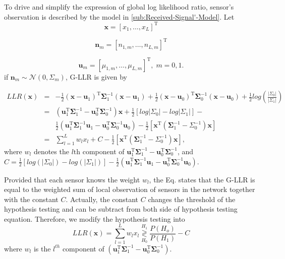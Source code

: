 To drive and simplify the expression of global log likelihood ratio,
sensor\textquoteright{}s observation is described by the model in
\ref{sub:Received-Signal'-Model}. Let 
\[
\mathbf{x}=\left[x_{1},\ldots,x_{L}\right]^{\mathrm{T}}
\]


\[
\mathbf{n}_{m}=\left[n_{1,m},\ldots,n_{L,m}\right]^{\mathrm{T}}
\]


\begin{equation}
\mathbf{u}_{m}=\left[\mu_{1,m},\ldots,\mu_{L,m}\right]^{\mathrm{T}},\; m=0,1.
\end{equation}
 if $\mathbf{n}_{m}\sim\mathcal{N}\left(0,\Sigma_{m}\right)$, G-LLR
is given by 

\begin{eqnarray}
LLR(\mathbf{x}) & = & -\frac{1}{2}\left(\mathbf{x}-\mathbf{u}_{1}\right)^{\mathrm{T}}\mathbf{\Sigma}_{1}^{-1}\left(\mathbf{x}-\mathbf{u}_{1}\right)+\frac{1}{2}\left(\mathbf{x}-\mathbf{u}_{0}\right)^{\mathrm{T}}\mathbf{\Sigma}_{0}^{-1}\left(\mathbf{x}-\mathbf{u}_{0}\right)+\frac{1}{2}log\left(\frac{\left|\Sigma_{0}\right|}{\left|\Sigma_{1}\right|}\right)\\
 & = & \left(\mathbf{u}_{1}^{\mathrm{T}}\mathbf{\Sigma}_{1}^{-1}-\mathbf{u}_{0}^{\mathrm{T}}\mathbf{\Sigma}_{0}^{-1}\right)\mathbf{x}+\frac{1}{2}\left[log\left|\Sigma_{0}\right|-log\left|\Sigma_{1}\right|\right]-\nonumber \\
 &  & \frac{1}{2}\left(\mathbf{u}_{1}^{\mathrm{T}}\mathbf{\Sigma}_{1}^{-1}\mathbf{u}_{1}-\mathbf{u}_{0}^{\mathrm{T}}\mathbf{\Sigma}_{0}^{-1}\mathbf{u}_{0}\right)-\frac{1}{2}\left[\mathbf{x}^{\mathrm{T}}\left(\mathbf{\Sigma}_{1}^{-1}-\Sigma_{0}^{-1}\right)\mathbf{x}\right]\label{eq:G-LLR Expand}\\
 & = & \sum_{l=1}^{L}w_{l}x_{l}+C-\frac{1}{2}\left[\mathbf{x}^{\mathrm{T}}\left(\mathbf{\Sigma}_{1}^{-1}-\Sigma_{0}^{-1}\right)\mathbf{x}\right],\label{eq:G-LLR simple}
\end{eqnarray}
where $w_{l}$ denotes the $l\mbox{th}$ component of $\mathbf{u}_{1}^{\mathrm{T}}\mathbf{\Sigma}_{1}^{-1}-\mathbf{u}_{0}^{\mathrm{T}}\mathbf{\Sigma}_{0}^{-1}$,
and $C=\frac{1}{2}\left[log\left(\left|\Sigma_{0}\right|\right)-log(\left|\Sigma_{1}\right|)\right]-\frac{1}{2}\left(\mathbf{u}_{1}^{\mathrm{T}}\mathbf{\Sigma}_{1}^{-1}\mathbf{u}_{1}-\mathbf{u}_{0}^{\mathrm{T}}\mathbf{\Sigma}_{0}^{-1}\mathbf{u}_{0}\right)$. 

Provided that each sensor knows the weight $w_{l}$, the Eq.
states that the G-LLR is equal to the weighted sum of local observation
of sensors in the network together with the constant $C$. Actually,
the constant $C$ changes the threshold of the hypothesis testing
and can be subtract from both side of hypothesis testing equation.
Therefore, we modify the hypothesis testing into 
\begin{equation}
LLR(\mathbf{x})=\sum_{l=1}^{L}w_{l}x_{l}\underset{H_{0}}{\overset{H_{1}}{\gtrless}}\frac{P\left(H_{o}\right)}{P\left(H_{1}\right)}-C\label{eq:GLLR in weighted sum}
\end{equation}
where $w_{l}$ is the $l^{th}$ component of $\left(\mathbf{u}_{1}^{\mathrm{T}}\mathbf{\Sigma}_{1}^{-1}-\mathbf{u}_{0}^{\mathrm{T}}\mathbf{\Sigma}_{0}^{-1}\right)$. 

